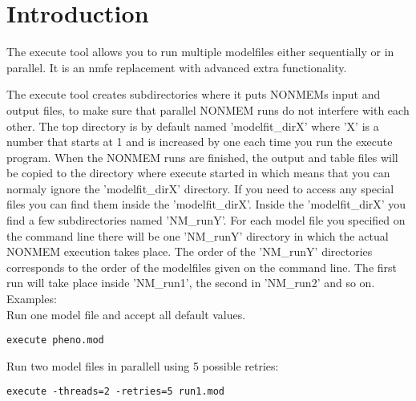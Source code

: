 
\usepackage{hyperref}



\maketitle
\newcommand{\guidetoolname}{execute}
\tableofcontents
\newpage

\section{Introduction}
The execute tool allows you to run multiple modelfiles either sequentially or in parallel. It is an nmfe replacement with advanced extra functionality.

The execute tool creates subdirectories where it puts NONMEMs input and output files, to make sure that parallel 
NONMEM runs do not interfere with each other. The top directory is by default named 'modelfit\_dirX' where 'X' is a 
number that starts at 1 and is increased by one each time you run the execute program. When the NONMEM runs are 
finished, the output and table files will be copied to the directory where execute started in which means that you can 
normaly ignore the 'modelfit\_dirX' directory. If you need to access any special files you can find them inside the  
'modelfit\_dirX'. Inside the 'modelfit\_dirX' you find a few subdirectories named 'NM\_runY'. For each model file you 
specified on the command line there will be one 'NM\_runY' directory in which the actual NONMEM execution takes place. 
The order of the 'NM\_runY' directories corresponds to the order of the modelfiles given on the command line. The first run 
will take place inside 'NM\_run1', the second in 'NM\_run2' and so on.\\
Examples:\\
Run one model file and accept all default values.

\begin{verbatim}
execute pheno.mod
\end{verbatim}

Run two model files in parallell using 5 possible retries:

\begin{verbatim}
execute -threads=2 -retries=5 run1.mod 
\end{verbatim}

